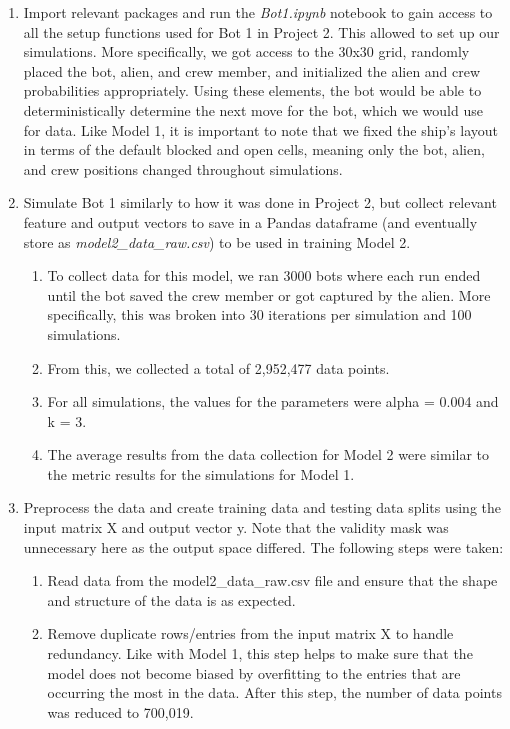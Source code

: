 \documentclass[11pt]{article}
\begin{document}
\begin{enumerate}
    \item Import relevant packages and run the \emph{Bot1.ipynb} notebook to gain access to all the setup functions used for Bot 1 in Project 2. 
    This allowed to set up our simulations. More specifically, we got access to the 30x30 grid, randomly placed the bot, alien, and crew member, and initialized the alien and crew probabilities appropriately. 
    Using these elements, the bot would be able to deterministically determine the next move for the bot, which we would use for data.  
    Like Model 1, it is important to note that we fixed the ship's layout in terms of the default blocked and open cells, meaning only the bot, alien, and crew positions changed throughout simulations. 
    \item Simulate Bot 1 similarly to how it was done in Project 2, but collect relevant feature and output vectors to save in a Pandas dataframe (and eventually store as \emph{model2\_data\_raw.csv}) to be used in training Model 2. 
    \begin{enumerate}
        \item To collect data for this model, we ran 3000 bots where each run ended until the bot saved the crew member or got captured by the alien. More specifically, this was broken into 30 iterations per simulation and 100 simulations. 
         \item From this, we collected a total of 2,952,477 data points. 
         \item For all simulations, the values for the parameters were alpha = 0.004 and k = 3.
         \item The average results from the data collection for Model 2 were similar to the metric results for the simulations for Model 1. 
    \end{enumerate}
    \item Preprocess the data and create training data and testing data splits using the input matrix X and output vector y. Note that the validity mask was unnecessary here as the output space differed. The following steps were taken:
        \begin{enumerate}
        \item Read data from the model2\_data\_raw.csv file and ensure that the shape and structure of the data is as expected. 
        \item Remove duplicate rows/entries from the input matrix X to handle redundancy. Like with Model 1, this step helps to make sure that the model does not become biased by overfitting to the entries that are occurring the most in the data. After this step, the number of data points was reduced to 700,019. 

\end{enumerate}
\end{enumerate}
\end{document}
